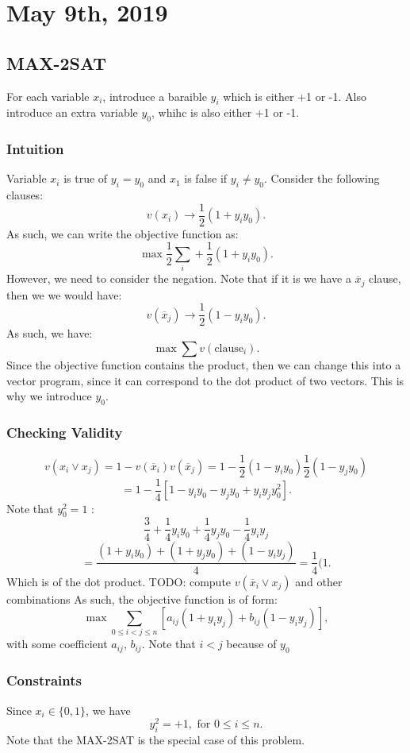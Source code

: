 \documentclass[../main/main.tex]{subfiles}
\begin{document}
\section{May  9th, 2019}
\subsection{MAX-2SAT}
For each variable $x_i$, introduce a baraible $y_i$ which is either +1 or -1. Also introduce an extra variable $y_0$, whihc is also either +1 or -1.

\subsubsection*{Intuition}
Variable $x_i$ is true of $y_i=y_0$ and  $x_1$ is false if $y_i\neq y_0$. Consider the following clauses:  \[
	v(x_i) \to \frac{1}{2}\left( 1+y_iy_0 \right) 
.\] As such, we can write the objective function as: \[
\max \frac{1}{2}\sum_i+ \frac{1}{2}(1+y_iy_0)
.\] However, we need to consider the negation. Note that if it is we have a  $\overline{x}_j$ clause, then we we would have: \[
v(\overline{x}_j) \to  \frac{1}{2}\left( 1-y_iy_0 \right) 
.\] As such, we have: \[
\max \sum v(\text{clause}_i)
.\] Since the objective function contains the product, then we can change this into a vector program, since it can correspond to the dot product of two vectors. This is why we introduce $y_0$.
\subsubsection*{Checking Validity}
\[
	v(x_i \vee x_j) = 1-v(\overline{x}_i)v(\overline{x}_j) = 1-\frac{1}{2}(1-y_iy_0)\frac{1}{2}(1-y_jy_0)
\] \[
=1- \frac{1}{4}\left[ 1-y_iy_0-y_jy_0+y_iy_jy_0^2 \right] 
.\] Note that $y_0^2=1$ : \[
\frac{3}{4}+ \frac{1}{4}y_iy_0+\frac{1}{4}y_jy_0-\frac{1}{4}y_iy_j \]\[
= \frac{(1+y_iy_0)+(1+y_jy_0)+(1-y_iy_j)}{4}= \frac{1}{4}(1
.\] Which is of the dot product. 
TODO: compute $v(\overline{x}_i \vee x_j)$ and other combinations
As such, the objective function is of form: \[
	\max \sum_{0\le i<j\le n} \left[a_{ij}(1+y_iy_j)+b_{ij}(1-y_iy_j)\right]
,\] with some coefficient $a_{ij}$, $b_{ij}$. Note that $i<j$ because of $y_0$ 
\subsubsection*{Constraints}
Since $x_i\in \{0,1\} $, we have  \[
y^2_i=+1, \text{ for $0\le i\le n$}
.\] Note that the MAX-2SAT is the special case of this problem.
\end{document}
